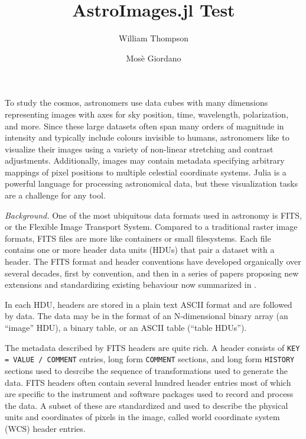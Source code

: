\documentclass{juliacon}
\begin{document}
% 

\title{AstroImages.jl Test}

\author[1]{William Thompson}
\author[2]{Mosè Giordano}




\maketitle

To study the cosmos, astronomers use data cubes with many dimensions representing images with axes for sky position, time, wavelength, polarization, and more. Since these large datasets often span many orders of magnitude in intensity and typically include colours invisible to humans, astronomers like to visualize their images using a variety of non-linear stretching and contrast adjustments.
Additionally, images may contain metadata specifying arbitrary mappings of pixel positions to multiple celestial coordinate systems.
Julia\cite{bezanson2017julia} is a powerful language for processing astronomical data, but these visualization tasks are a challenge for any tool.

\vspace{0.2cm}
\emph{Background.}
One of the most ubiquitous data formats used in astronomy is FITS, or the Flexible Image Transport System.
Compared to a traditional raster image formats, FITS files are more like containers or small filesystems.
Each file contains one or more header data units (HDUs) that pair a dataset with a header.
The FITS format and header conventions have developed organically over several decades, first by convention,
and then in a series of papers proposing new extensions and standardizing existing behaviour now summarized in \cite{fitsstandard}.

In each HDU,
headers are stored in a plain text ASCII format and are followed by data.
The data may be in the format of an N-dimensional binary array (an ``image'' HDU),
a binary table,
or an ASCII table (``table HDUs'').

The metadata described by FITS headers are quite rich.
A header consists of \verb|KEY = VALUE / COMMENT| entries, long form \verb|COMMENT| sections,
and long form \verb|HISTORY| sections used to desrcibe the sequence of transformations used to generate the data.
FITS headers often contain several hundred header entries most of which are specific to the instrument and software packages used to record and process the data.
A subset of these are standardized and used to describe the physical units and coordinates of pixels in the image, called world coordinate system (WCS) header entries.
\end{document}
